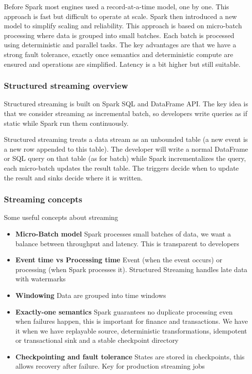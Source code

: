 Before Spark most engines used a record-at-a-time model, one by one. This approach is fast but difficult to operate at scale. Spark then introduced a new model to simplify scaling and reliability. This approach is based on micro-batch processing where data is grouped into small batches. Each batch is processed using deterministic and parallel tasks. The key advantages are that we have a strong fault tolerance, exactly once semantics and deterministic compute are ensured and operations are simplified. Latency is a bit higher but still suitable. 


\subsubsection{Structured streaming overview}

Structured streaming is built on Spark SQL and DataFrame API. The key idea is that we consider streaming as incremental batch, so developers write queries as if static while Spark run them continuously. 

\vspace{10pt}

Structured streaming treats a data stream as an unbounded table (a new event is a new row appended to this table). The developer will write a normal DataFrame or SQL query on that table (as for batch) while Spark incrementalizes the query, each micro-batch updates the result table. The triggers decide when to update the result and sinks decide where it is written.


\subsubsection{Streaming concepts}

Some useful concepts about streaming

\begin{itemize}
    \item \textbf{Micro-Batch model} \ra Spark processes small batches of data, we want a balance between throughput and latency. This is transparent to developers
    \item \textbf{Event time vs Processing time} \ra Event (when the event occurs) or processing (when Spark processes it). Structured Streaming handles late data with watermarks
    \item \textbf{Windowing} \ra Data are grouped into time windows
    \item \textbf{Exactly-one semantics} \ra Spark guarantees no duplicate processing even when failures happen, this is important for finance and transactions. We have it when we have replayable source, deterministic transformations, idempotent or transactional sink and a stable checkpoint directory
    \item \textbf{Checkpointing and fault tolerance} \ra States are stored in checkpoints, this allows recovery after failure. Key for production streaming jobs
\end{itemize}


